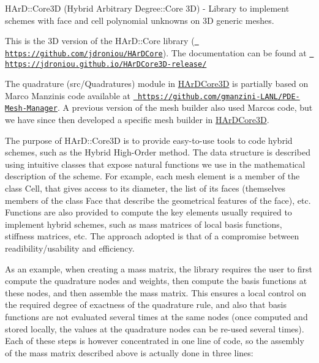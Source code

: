 H\+Ar\+D\+::\+Core3D (Hybrid Arbitrary Degree\+::\+Core 3D) -\/ Library to implement schemes with face and cell polynomial unknowns on 3D generic meshes.

This is the 3D version of the H\+Ar\+D\+::\+Core library (\href{https://github.com/jdroniou/HArDCore}{\texttt{ https\+://github.\+com/jdroniou/\+H\+Ar\+D\+Core}}). The documentation can be found at \href{https://jdroniou.github.io/HArDCore3D-release/}{\texttt{ https\+://jdroniou.\+github.\+io/\+H\+Ar\+D\+Core3\+D-\/release/}}

The quadrature (src/\+Quadratures) module in \mbox{\hyperlink{namespaceHArDCore3D}{H\+Ar\+D\+Core3D}} is partially based on Marco Manzini\textquotesingle{}s code available at \href{https://github.com/gmanzini-LANL/PDE-Mesh-Manager}{\texttt{ https\+://github.\+com/gmanzini-\/\+L\+A\+N\+L/\+P\+D\+E-\/\+Mesh-\/\+Manager}}. A previous version of the mesh builder also used Marco\textquotesingle{}s code, but we have since then developed a specific mesh builder in \mbox{\hyperlink{namespaceHArDCore3D}{H\+Ar\+D\+Core3D}}.

The purpose of H\+Ar\+D\+::\+Core3D is to provide easy-\/to-\/use tools to code hybrid schemes, such as the Hybrid High-\/\+Order method. The data structure is described using intuitive classes that expose natural functions we use in the mathematical description of the scheme. For example, each mesh element is a member of the class \textquotesingle{}Cell\textquotesingle{}, that gives access to its diameter, the list of its faces (themselves members of the class \textquotesingle{}Face\textquotesingle{} that describe the geometrical features of the face), etc. Functions are also provided to compute the key elements usually required to implement hybrid schemes, such as mass matrices of local basis functions, stiffness matrices, etc. The approach adopted is that of a compromise between readibility/usability and efficiency.

As an example, when creating a mass matrix, the library requires the user to first compute the quadrature nodes and weights, then compute the basis functions at these nodes, and then assemble the mass matrix. This ensures a local control on the required degree of exactness of the quadrature rule, and also that basis functions are not evaluated several times at the same nodes (once computed and stored locally, the values at the quadrature nodes can be re-\/used several times). Each of these steps is however concentrated in one line of code, so the assembly of the mass matrix described above is actually done in three lines\+:


